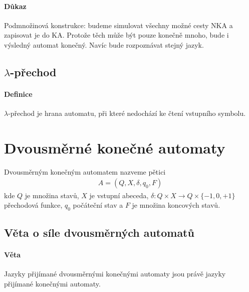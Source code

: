 \documentclass[a4paper,12pt,titlepage]{article}
\begin{document}
\paragraph{Důkaz}
Podmnožinová konstrukce: budeme simulovat všechny možné cesty NKA a zapisovat je
do KA. Protože těch může být pouze konečně mnoho, bude i výsledný automat
konečný. Navíc bude rozpoznávat stejný jazyk.
\subsection{$\lambda$-přechod}
\setcounter{equation}{0}
\paragraph{Definice}
$\lambda$-přechod je hrana automatu, při které nedochází ke čtení vstupního
symbolu.
\section{Dvousměrné konečné automaty}
\setcounter{equation}{0}
Dvousměrným konečným automatem nazveme pětici
\begin{align}
	A = (Q, X, \delta, q_0, F)
\end{align}
kde $Q$ je množina stavů, $X$ je vstupní abeceda, $\delta: Q \times X \to
Q\times\{-1, 0, +1\}$
přechodová funkce, $q_0$ počáteční stav a $F$ je množina koncových stavů.
\subsection{Věta o síle dvousměrných automatů}
\setcounter{equation}{0}
\paragraph{Věta}
Jazyky přijímané dvousměrnými konečnými automaty jsou právě jazyky přijímané
konečnými automaty.
\end{document}
